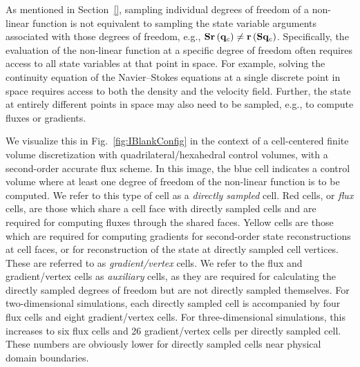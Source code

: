 As mentioned in Section~\ref{}, sampling individual degrees of freedom of a non-linear function is not equivalent to sampling the state variable arguments associated with those degrees of freedom, e.g., $\mathbf{S} \mathbf{r}\left(\mathbf{q}_{c}\right) \neq \mathbf{r}\left(\mathbf{S} \mathbf{q}_{c}\right)$. Specifically, the evaluation of the non-linear function at a specific degree of freedom often requires access to all state variables at that point in space. For example, solving the continuity equation of the Navier--Stokes equations at a single discrete point in space requires access to both the density and the velocity field. Further, the state at entirely different points in space may also need to be sampled, e.g., to compute fluxes or gradients.

We visualize this in Fig.~\ref{fig:IBlankConfig} in the context of a cell-centered finite volume discretization with quadrilateral/hexahedral control volumes, with a second-order accurate flux scheme. In this image, the blue cell indicates a control volume where at least one degree of freedom of the non-linear function is to be computed. We refer to this type of cell as a \textit{directly sampled} cell. Red cells, or \textit{flux} cells, are those which share a cell face with directly sampled cells and are required for computing fluxes through the shared faces. Yellow cells are those which are required for computing gradients for second-order state reconstructions at cell faces, or for reconstruction of the state at directly sampled cell vertices. These are referred to as \textit{gradient/vertex} cells. We refer to the flux and gradient/vertex cells as \textit{auxiliary} cells, as they are required for calculating the directly sampled degrees of freedom but are not directly sampled themselves. For two-dimensional simulations, each directly sampled cell is accompanied by four flux cells and eight gradient/vertex cells. For three-dimensional simulations, this increases to six flux cells and 26 gradient/vertex cells per directly sampled cell. These numbers are obviously lower for directly sampled cells near physical domain boundaries.

